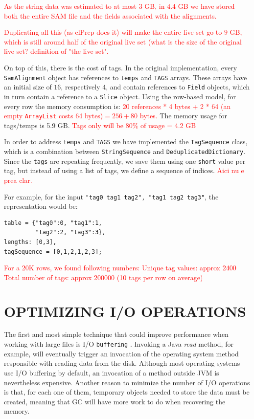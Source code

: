 \documentclass[a4paper,twoside]{article}
\begin{document}
\textcolor{red}{
As the string data was estimated to at most $3$ GB, in $4.4$ GB we have stored both the entire SAM file and the fields associated with the alignments.
}

\textcolor{red}{
Duplicating all this (as elPrep does it) will make the entire live set go to $9$ GB, which is still around half of the original live set (what is the size of the original live set? definition of "the live set".
}

On top of this, there is the cost of tags.
In the original implementation, every {\tt SamAlignment} object has references to {\tt temps} and {\tt TAGS} arrays. These arrays have an initial size of $16$, respectively $4$, and contain references to {\tt Field} objects, which in turn contain a reference to a {\tt Slice} object.
Using the row-based model, for every row the memory consumption is:
\textcolor{red}{20 references * 4 bytes + 2 * 64 (an empty {\tt ArrayList} costs 64 bytes)$= 256 + 80$ bytes.}
The memory usage for tags/temps is 5.9 GB. 
\textcolor{red}{Tags only will be 80\% of usage = 4.2 GB}

In order to address {\tt temps} and {\tt TAGS} we have implemented the {\tt TagSequence} class, which is a combination between {\tt StringSequence} and {\tt DeduplicatedDictionary}.
Since the {\tt tags} are repeating frequently, we save them using one {\tt short} value per tag, but instead of using a list of tags, we define a sequence of indices.
\textcolor{red}{Aici nu e prea clar.}

For example, for the input {\tt "tag0 tag1 tag2", "tag1 tag2 tag3"}, the representation would be:
\begin{verbatim}
table = {"tag0":0, "tag1":1, 
         "tag2":2, "tag3":3},
lengths: [0,3], 
tagSequence = [0,1,2,1,2,3]; 
\end{verbatim}

\textcolor{red}{
For a 20K rows, we found following numbers:
Unique tag values: approx 2400
Total number of tags: approx 200000 (10 tags per row on average)
}



\section{\uppercase{Optimizing I/O Operations}}

The first and most simple technique that could improve performance when working with large files
is I/O {\tt buffering} \cite{oaks:2014}. Invoking a Java {\it read} method, for example, will eventually trigger an invocation of the operating system method responsible with reading data from the disk.
Although most operating systems use I/O buffering by default, an invocation of a method outside JVM is nevertheless expensive. Another reason to minimize the number of I/O operations is that, for each one of them, temporary objects needed to store the data must be created, meaning that GC will have more work to do when recovering the memory.
\end{document}
